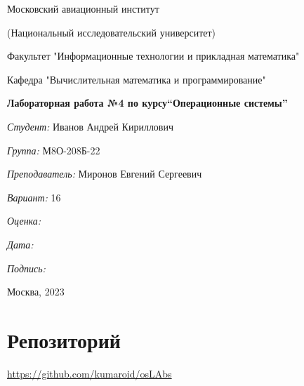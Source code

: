\documentclass[a4paper, 12pt]{article}
\begin{document}
\thispagestyle{empty}	
\begin{center}
	Московский авиационный институт
	
	(Национальный исследовательский университет)
	
	Факультет "Информационные технологии и прикладная математика"
	
	Кафедра "Вычислительная математика и программирование"
	
\end{center}
\vspace{40ex}
\begin{center}
	\textbf{\large{Лабораторная работа №4 по курсу\linebreak \textquotedblleft Операционные системы\textquotedblright}}
\end{center}
\vspace{35ex}
\begin{flushright}
	\textit{Студент: } Иванов Андрей Кириллович
	
	\vspace{2ex}
	\textit{Группа: } М8О-208Б-22
	
	\vspace{2ex}
	\textit{Преподаватель: } Миронов Евгений Сергеевич
	
	\vspace{2ex}
	\textit{Вариант: } 16 
	
	\vspace{2ex}
	\textit{Оценка: } \underline{\quad\quad\quad\quad\quad\quad}
	
	 \vspace{2ex}
	\textit{Дата: } \underline{\quad\quad\quad\quad\quad\quad}
	
	\vspace{2ex}
	\textit{Подпись: } \underline{\quad\quad\quad\quad\quad\quad}
	
\end{flushright}

\vspace{5ex}

\begin{vfill}
	\begin{center}
		Москва, 2023
	\end{center}	
\end{vfill}
\newpage

\begingroup
\color{black}
\tableofcontents\newpage
\endgroup

\section{Репозиторий}
\href{https://github.com/kumaroid/osLabs}{https://github.com/kumaroid/osLAbs}
\end{document}

